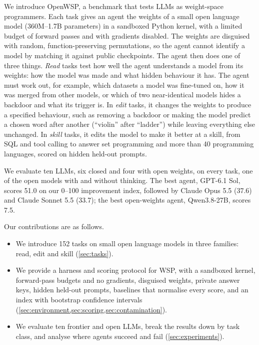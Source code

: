 \documentclass[11pt]{article}
\newcommand{\bench}{OpenWSP\xspace}
\begin{document}
We introduce \bench, a benchmark that tests LLMs as weight-space programmers. Each task gives
an agent the weights of a small open language model (360M--1.7B parameters) in a sandboxed
Python kernel, with a limited budget of forward passes and with gradients disabled. The
weights are disguised with random, function-preserving permutations, so the agent cannot
identify a model by matching it against public checkpoints. The agent then does one of three
things. \emph{Read} tasks test how well the agent understands a model from its weights: how
the model was made and what hidden behaviour it has. The agent must work out, for example,
which datasets a model was fine-tuned on, how it was merged from other models, or which of two
near-identical models hides a backdoor and what its trigger is. In \emph{edit} tasks, it
changes the weights to produce a specified behaviour, such as removing a backdoor or making
the model predict a chosen word after another (``violin'' after ``ladder'') while leaving
everything else unchanged. In \emph{skill} tasks, it edits the model to make it better
at a skill, from SQL and tool calling to answer set programming and more than 40 programming
languages, scored on hidden held-out prompts.

We evaluate ten LLMs, six closed and four with open weights, on every task, one of the open
models with and without thinking. The best agent,
GPT-6.1 Sol, scores 51.0 on our 0--100 improvement index, followed by Claude Opus 5.5 (37.6)
and Claude Sonnet 5.5 (33.7); the best open-weights agent, Qwen3.8-27B, scores 7.5.

Our contributions are as follows.
\begin{itemize}
  \item We introduce 152 tasks on small open language models in three families: read, edit
  and skill (\cref{sec:tasks}).
  \item We provide a harness and scoring protocol for WSP, with a sandboxed kernel,
  forward-pass budgets and no gradients, disguised weights, private answer keys, hidden
  held-out prompts, baselines that normalise every score, and an index with bootstrap
  confidence intervals (\cref{sec:environment,sec:scoring,sec:contamination}).
  \item We evaluate ten frontier and open LLMs, break the results down by task class, and
  analyse where agents succeed and fail (\cref{sec:experiments}).
\end{itemize}

\end{document}
